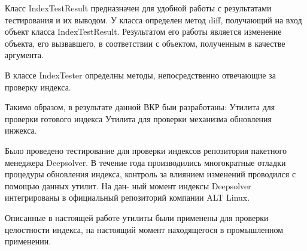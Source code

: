 \documentclass[a4paper]{article}
\begin{document}
Класс IndexTestResult предназначен для удобной работы с результатами тестирования и их выводом. У класса определен метод diff, получающий на вход объект класса IndexTestResult. Результатом его работы является изменение объекта, его вызвавшего, в соответствии
с объектом, полученным в качестве аргумента.

В классе IndexTester определны методы, непосредственно отвечающие за проверку индекса.

Такимо образом, в результате данной ВКР быи разработаны:
Утилита для проверки готового индекса
Утилита для проверки механизма обновления инжекса.

Было проведено тестирование для проверки индексов репозитория пакетного менеджера
Deepsolver.
В течение года производились многократные отладки процедуры обновления
индекса, контроль за влиянием изменений проводился с помощью данных утилит. На дан-
ный момент индексы Deepsolver интегрированы в официальный репозиторий компании ALT Linux.

Описанные в настоящей работе утилиты были применены для проверки целостности индекса, на настоящий момент находящегося в промышленном применении.
\end{document}
